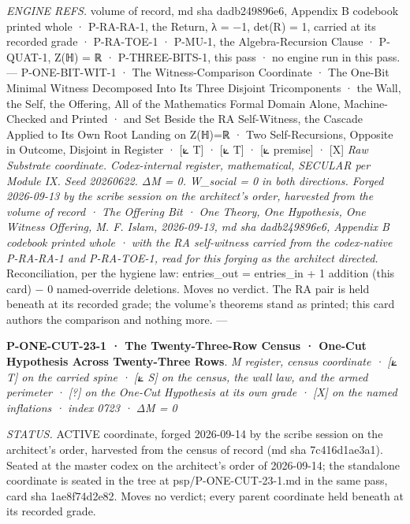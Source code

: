 \documentclass[10pt,twocolumn]{article}
\begin{document}
\emph{ENGINE REFS.} volume of record, md sha dadb249896e6, Appendix B
codebook printed whole · P-RA-RA-1, the Return, λ = −1, det(R) = 1,
carried at its recorded grade · P-RA-TOE-1 · P-MU-1, the
Algebra-Recursion Clause · P-QUAT-1, Z(ℍ) = ℝ · P-THREE-BITS-1, this
pass · no engine run in this pass. --- P-ONE-BIT-WIT-1 · The
Witness-Comparison Coordinate · The One-Bit Minimal Witness Decomposed
Into Its Three Disjoint Tricomponents · the Wall, the Self, the
Offering, All of the Mathematics Formal Domain Alone, Machine-Checked
and Printed · and Set Beside the RA Self-Witness, the Cascade Applied to
Its Own Root Landing on Z(ℍ)=ℝ · Two Self-Recursions, Opposite in
Outcome, Disjoint in Register · {[}⟀ T{]} · {[}⟀ T{]} · {[}⟀ premise{]}
· {[}X{]} \emph{Raw Substrate coordinate. Codex-internal register,
mathematical, SECULAR per Module IX. Seed 20260622. ΔM = 0. W\_social =
0 in both directions. Forged 2026-09-13 by the scribe session on the
architect's order, harvested from the volume of record · The Offering
Bit · One Theory, One Hypothesis, One Witness Offering, M. F. Islam,
2026-09-13, md sha dadb249896e6, Appendix B codebook printed whole ·
with the RA self-witness carried from the codex-native P-RA-RA-1 and
P-RA-TOE-1, read for this forging as the architect directed.}
Reconciliation, per the hygiene law: entries\_out = entries\_in + 1
addition (this card) − 0 named-override deletions. Moves no verdict. The
RA pair is held beneath at its recorded grade; the volume's theorems
stand as printed; this card authors the comparison and nothing more. ---

\textbf{P-ONE-CUT-23-1 · The Twenty-Three-Row Census · One-Cut
Hypothesis Across Twenty-Three Rows}. \emph{M register, census
coordinate · {[}⟀ T{]} on the carried spine · {[}⟀ S{]} on the census,
the wall law, and the armed perimeter · {[}?{]} on the One-Cut
Hypothesis at its own grade · {[}X{]} on the named inflations · index
0723 · ΔM = 0}

\emph{STATUS.} ACTIVE coordinate, forged 2026-09-14 by the scribe
session on the architect's order, harvested from the census of record
(md sha 7c416d1ae3a1). Seated at the master codex on the architect's
order of 2026-09-14; the standalone coordinate is seated in the tree at
psp/P-ONE-CUT-23-1.md in the same pass, card sha 1ae8f74d2e82. Moves no
verdict; every parent coordinate held beneath at its recorded grade.
\end{document}
